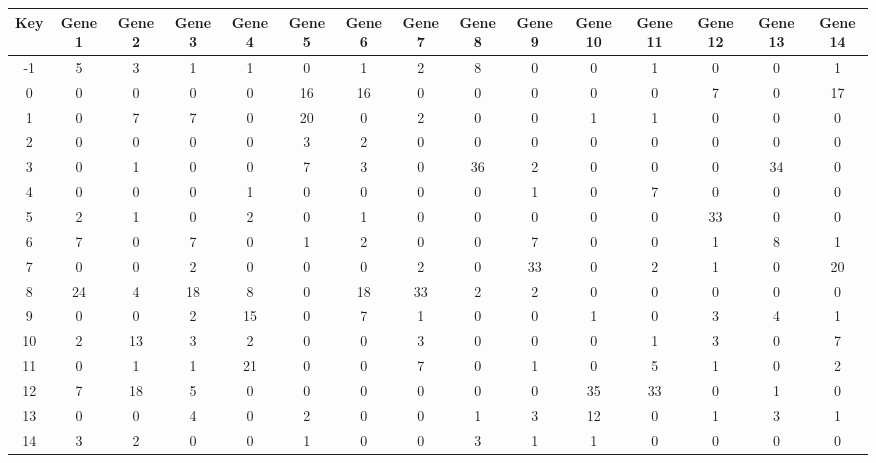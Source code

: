 \begin{tabular}{|c|c|c|c|c|c|c|c|c|c|c|c|c|c|c|}
\hline
Key & Gene 1 & Gene 2 & Gene 3 & Gene 4 & Gene 5 & Gene 6 & Gene 7 & Gene 8 & Gene 9 & Gene 10 & Gene 11 & Gene 12 & Gene 13 & Gene 14 \\
\hline
-1 & 5 & 3 & 1 & 1 & 0 & 1 & 2 & 8 & 0 & 0 & 1 & 0 & 0 & 1 \\
0 & 0 & 0 & 0 & 0 & 16 & 16 & 0 & 0 & 0 & 0 & 0 & 7 & 0 & 17 \\
1 & 0 & 7 & 7 & 0 & 20 & 0 & 2 & 0 & 0 & 1 & 1 & 0 & 0 & 0 \\
2 & 0 & 0 & 0 & 0 & 3 & 2 & 0 & 0 & 0 & 0 & 0 & 0 & 0 & 0 \\
3 & 0 & 1 & 0 & 0 & 7 & 3 & 0 & 36 & 2 & 0 & 0 & 0 & 34 & 0 \\
4 & 0 & 0 & 0 & 1 & 0 & 0 & 0 & 0 & 1 & 0 & 7 & 0 & 0 & 0 \\
5 & 2 & 1 & 0 & 2 & 0 & 1 & 0 & 0 & 0 & 0 & 0 & 33 & 0 & 0 \\
6 & 7 & 0 & 7 & 0 & 1 & 2 & 0 & 0 & 7 & 0 & 0 & 1 & 8 & 1 \\
7 & 0 & 0 & 2 & 0 & 0 & 0 & 2 & 0 & 33 & 0 & 2 & 1 & 0 & 20 \\
8 & 24 & 4 & 18 & 8 & 0 & 18 & 33 & 2 & 2 & 0 & 0 & 0 & 0 & 0 \\
9 & 0 & 0 & 2 & 15 & 0 & 7 & 1 & 0 & 0 & 1 & 0 & 3 & 4 & 1 \\
10 & 2 & 13 & 3 & 2 & 0 & 0 & 3 & 0 & 0 & 0 & 1 & 3 & 0 & 7 \\
11 & 0 & 1 & 1 & 21 & 0 & 0 & 7 & 0 & 1 & 0 & 5 & 1 & 0 & 2 \\
12 & 7 & 18 & 5 & 0 & 0 & 0 & 0 & 0 & 0 & 35 & 33 & 0 & 1 & 0 \\
13 & 0 & 0 & 4 & 0 & 2 & 0 & 0 & 1 & 3 & 12 & 0 & 1 & 3 & 1 \\
14 & 3 & 2 & 0 & 0 & 1 & 0 & 0 & 3 & 1 & 1 & 0 & 0 & 0 & 0 \\
\hline
\end{tabular}